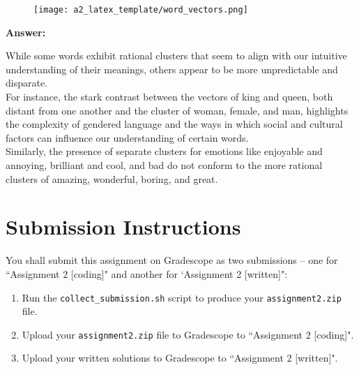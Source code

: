 \documentclass{article}
\newenvironment{answer}{
    {\bf Answer:} \sf \begingroup\color{red}
}{\endgroup}%
\begin{document}
\begin{enumerate}[label=(\alph*)]
\begin{figure}[t]
\texttt{[image: a2\_latex\_template/word\_vectors.png]}
\centering
\end{figure}

\begin{shaded}
\begin{answer}
While some words exhibit rational clusters that seem to align with our intuitive understanding of their meanings, others appear to be more unpredictable and disparate. \\
For instance, the stark contrast between the vectors of king and queen, both distant from one another and the cluster of woman, female, and man, highlights the complexity of gendered language and the ways in which social and cultural factors can influence our understanding of certain words. \\
Similarly, the presence of separate clusters for emotions like enjoyable and annoying, brilliant and cool, and bad do not conform to the more rational clusters of amazing, wonderful, boring, and great.
\end{answer}
\end{shaded}

\section{Submission Instructions}
You shall submit this assignment on Gradescope as two submissions -- one for ``Assignment 2 [coding]" and another for `Assignment 2 [written]":
\begin{enumerate}
    \item Run the \texttt{collect\_submission.sh} script to produce your \texttt{assignment2.zip} file.
    \item Upload your \texttt{assignment2.zip} file to Gradescope to ``Assignment 2 [coding]".
    \item Upload your written solutions to Gradescope to ``Assignment 2 [written]".
\end{enumerate}

\end{enumerate}
\end{document}
